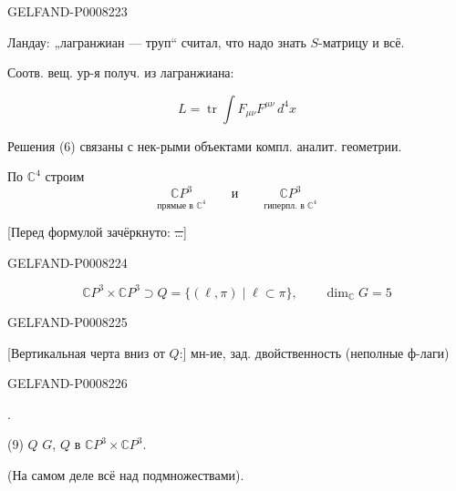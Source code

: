 \begin{GelfandAdjacentEvidence}{GELFAND-P000822}{3}


 \quad Ландау: „лагранжиан — труп“ считал, что надо знать \(S\)-матрицу и всё.

Соотв. вещ. ур-я получ. из лагранжиана:

\begin{equation*}
L=\operatorname{tr}\int F_{\mu\nu}F^{\mu\nu}\,d^4x
\tag{7}
\end{equation*}

Решения (6) связаны с нек-рыми объектами компл. аналит. геометрии.

По \(\mathbb{C}^4\) строим
\[
\underset{\text{прямые в \(\mathbb{C}^4\)}}{\mathbb{C}P^3}
\qquad\text{и}\qquad
\underset{\text{гиперпл. в \(\mathbb{C}^4\)}}{\mathbb{C}P^3}
\]

[Перед формулой зачёркнуто: \sout{…}]
\end{GelfandAdjacentEvidence}
\begin{GelfandAdjacentEvidence}{GELFAND-P000822}{4}


\begin{equation*}
\mathbb{C}P^3\times\mathbb{C}P^3\supset
 Q=\{(\ell,\pi)\mid\ell\subset\pi\},\qquad \dim_{\mathbb{C}}G=5
\tag{8}
\end{equation*}
\end{GelfandAdjacentEvidence}
\begin{GelfandAdjacentEvidence}{GELFAND-P000822}{5}


[Вертикальная черта вниз от \(Q\):] мн-ие, зад. двойственность (неполные ф-лаги)
\end{GelfandAdjacentEvidence}
\begin{GelfandAdjacentEvidence}{GELFAND-P000822}{6}


.

(9)  \(Q\)  \(G\), 
 \(Q\) в \(\mathbb{C}P^3\times\mathbb{C}P^3\).

(На самом деле всё над подмножествами).
\end{GelfandAdjacentEvidence}


